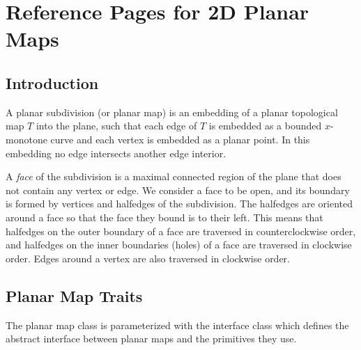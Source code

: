 


\clearpage
\section{Reference Pages for 2D Planar Maps}
\subsection*{Introduction}

A planar subdivision (or planar map) is an embedding of a planar 
topological map $T$ 
into the plane, such that each edge of $T$ is embedded as a
bounded $x$-monotone curve and each vertex is embedded as a planar point.
In this embedding no
edge intersects another edge interior.

A {\em face} of the subdivision is a maximal connected region of the
plane that does not contain any vertex or edge. 
We consider a face to be open, and its boundary is
formed by vertices and halfedges of the subdivision.
The halfedges are oriented around a face so that the face they bound
is to their left. This means that halfedges on the outer boundary
of a face are traversed in counterclockwise order, and halfedges on the inner
boundaries (holes) of a face are traversed in clockwise order. Edges around a
vertex are also traversed in clockwise order. 

\subsection*{Planar Map Traits}
The planar map class is parameterized with the
interface class  which defines the abstract interface
between planar maps and the primitives they use. 

